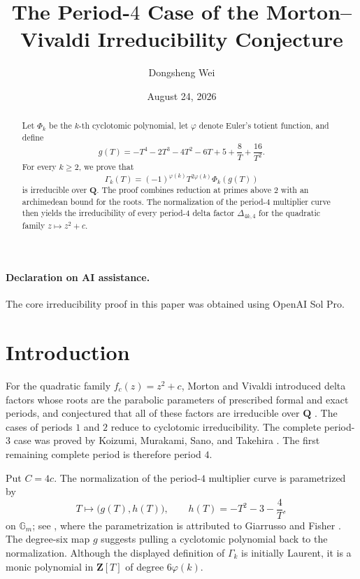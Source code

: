 \documentclass[11pt]{article}
\title{The Period-$4$ Case of the Morton--Vivaldi
Irreducibility Conjecture}
\author{Dongsheng Wei}
\date{August 24, 2026}
\newcommand{\Q}{\mathbf Q}
\newcommand{\Z}{\mathbf Z}
\begin{document}
\maketitle

\paragraph{Declaration on AI assistance.}
The core irreducibility proof in this paper was obtained using OpenAI
Sol Pro.

\begin{abstract}
Let $\Phi_k$ be the $k$-th cyclotomic polynomial, let $\varphi$ denote
Euler's totient function, and define
\[
 g(T)=-T^4-2T^3-4T^2-6T+5+\frac8T+\frac{16}{T^2}.
\]
For every $k\geq2$, we prove that
\[
 \Gamma_k(T)=(-1)^{\varphi(k)}T^{2\varphi(k)}\Phi_k(g(T))
\]
is irreducible over $\Q$.  The proof combines reduction at primes above
$2$ with an archimedean bound for the roots.  The normalization of the
period-$4$ multiplier curve then yields the irreducibility of every
period-$4$ delta factor $\Delta_{4k,4}$ for the quadratic family
$z\mapsto z^2+c$.
\end{abstract}

\section{Introduction}

For the quadratic family $f_c(z)=z^2+c$, Morton and Vivaldi introduced
delta factors whose roots are the parabolic parameters of prescribed
formal and exact periods, and conjectured that all of these factors are
irreducible over $\Q$ \cite{MortonVivaldi1995}.  The cases of periods $1$
and $2$ reduce to cyclotomic irreducibility.  The complete period-$3$ case
was proved by Koizumi, Murakami, Sano, and Takehira
\cite{KoizumiMurakamiSanoTakehira2025}.  The first remaining complete
period is therefore period $4$.

Put $C=4c$.  The normalization of the period-$4$ multiplier curve is
parametrized by
\begin{equation}\label{eq:parametrization}
 T\longmapsto \bigl(g(T),h(T)\bigr),
 \qquad
 h(T)=-T^2-3-\frac4T,
\end{equation}
on $\mathbb G_m$; see
\cite[Remark 2.10]{KoizumiMurakamiSanoTakehira2025}, where the
parametrization is attributed to Giarrusso and Fisher
\cite{GiarrussoFisher1995}.  The degree-six map
$g$ suggests pulling a cyclotomic polynomial back to the normalization.
Although the displayed definition of $\Gamma_k$ is initially Laurent,
it is a monic polynomial in $\Z[T]$ of degree $6\varphi(k)$.
\end{document}
